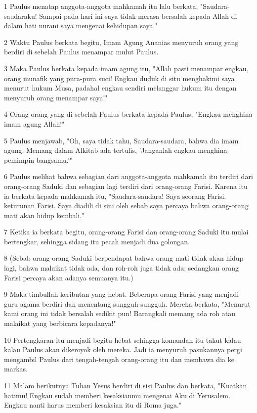\par 1 Paulus menatap anggota-anggota mahkamah itu lalu berkata, "Saudara-saudaraku! Sampai pada hari ini saya tidak merasa bersalah kepada Allah di dalam hati nurani saya mengenai kehidupan saya."
\par 2 Waktu Paulus berkata begitu, Imam Agung Ananias menyuruh orang yang berdiri di sebelah Paulus menampar mulut Paulus.
\par 3 Maka Paulus berkata kepada imam agung itu, "Allah pasti menampar engkau, orang munafik yang pura-pura suci! Engkau duduk di situ menghakimi saya menurut hukum Musa, padahal engkau sendiri melanggar hukum itu dengan menyuruh orang menampar saya!"
\par 4 Orang-orang yang di sebelah Paulus berkata kepada Paulus, "Engkau menghina imam agung Allah!"
\par 5 Paulus menjawab, "Oh, saya tidak tahu, Saudara-saudara, bahwa dia imam agung. Memang dalam Alkitab ada tertulis, 'Janganlah engkau menghina pemimpin bangsamu.'"
\par 6 Paulus melihat bahwa sebagian dari anggota-anggota mahkamah itu terdiri dari orang-orang Saduki dan sebagian lagi terdiri dari orang-orang Farisi. Karena itu ia berkata kepada mahkamah itu, "Saudara-saudara! Saya seorang Farisi, keturunan Farisi. Saya diadili di sini oleh sebab saya percaya bahwa orang-orang mati akan hidup kembali."
\par 7 Ketika ia berkata begitu, orang-orang Farisi dan orang-orang Saduki itu mulai bertengkar, sehingga sidang itu pecah menjadi dua golongan.
\par 8 (Sebab orang-orang Saduki berpendapat bahwa orang mati tidak akan hidup lagi, bahwa malaikat tidak ada, dan roh-roh juga tidak ada; sedangkan orang Farisi percaya akan adanya semuanya itu.)
\par 9 Maka timbullah keributan yang hebat. Beberapa orang Farisi yang menjadi guru agama berdiri dan menentang sungguh-sungguh. Mereka berkata, "Menurut kami orang ini tidak bersalah sedikit pun! Barangkali memang ada roh atau malaikat yang berbicara kepadanya!"
\par 10 Pertengkaran itu menjadi begitu hebat sehingga komandan itu takut kalau-kalau Paulus akan dikeroyok oleh mereka. Jadi ia menyuruh pasukannya pergi mengambil Paulus dari tengah-tengah orang-orang itu dan membawa dia ke markas.
\par 11 Malam berikutnya Tuhan Yesus berdiri di sisi Paulus dan berkata, "Kuatkan hatimu! Engkau sudah memberi kesaksianmu mengenai Aku di Yerusalem. Engkau nanti harus memberi kesaksian itu di Roma juga."
